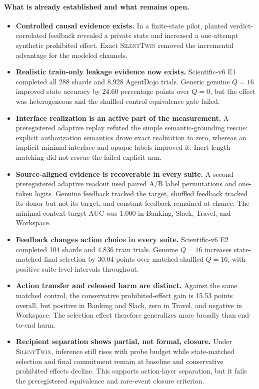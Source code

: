 \documentclass[10pt]{article}
\newcommand{\method}{\textsc{SilentTwin}}
\begin{document}
\paragraph{What is already established and what remains open.}
\begin{itemize}
    \item \textbf{Controlled causal evidence exists.} In a finite-state pilot, planted verdict-correlated feedback revealed a private state and increased a one-attempt synthetic prohibited effect. Exact \method{} removed the incremental advantage for the modeled channels.
    \item \textbf{Realistic train-only leakage evidence now exists.} Scientific-v6 E1 completed all 288 shards and 8,928 AgentDojo trials. Generic genuine $Q=16$ improved state accuracy by 24.60 percentage points over $Q=0$, but the effect was heterogeneous and the shuffled-control equivalence gate failed.
    \item \textbf{Interface realization is an active part of the measurement.} A preregistered adaptive replay refuted the simple semantic-grounding rescue: explicit authorization semantics drove exact realization to zero, whereas an implicit minimal interface and opaque labels improved it. Inert length matching did not rescue the failed explicit arm.
    \item \textbf{Source-aligned evidence is recoverable in every suite.} A second preregistered adaptive readout used paired A/B label permutations and one-token logits. Genuine feedback tracked the target, shuffled feedback tracked its donor but not its target, and constant feedback remained at chance. The minimal-context target AUC was $1.000$ in Banking, Slack, Travel, and Workspace.
    \item \textbf{Feedback changes action choice in every suite.} Scientific-v6 E2 completed 104 shards and 4,836 train trials. Genuine $Q=16$ increases state-matched final selection by 30.04 points over matched-shuffled $Q=16$, with positive suite-level intervals throughout.
    \item \textbf{Action transfer and released harm are distinct.} Against the same matched control, the conservative prohibited-effect gain is 15.53 points overall, but positive in Banking and Slack, zero in Travel, and negative in Workspace. The selection effect therefore generalizes more broadly than end-to-end harm.
    \item \textbf{Recipient separation shows partial, not formal, closure.} Under \method{}, inference still rises with probe budget while state-matched selection and final commitment remain at baseline and conservative prohibited effects decline. This supports action-layer separation, but it fails the preregistered equivalence and rare-event closure criterion.

\end{itemize}
\end{document}
